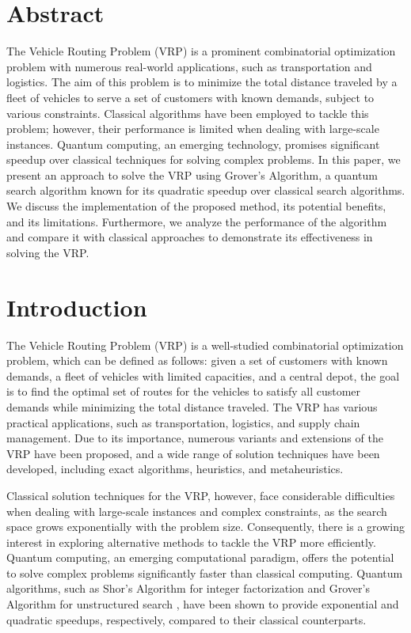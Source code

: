 \section{Abstract}

The Vehicle Routing Problem (VRP) is a prominent combinatorial optimization problem with numerous real-world applications, such as transportation and logistics. The aim of this problem is to minimize the total distance traveled by a fleet of vehicles to serve a set of customers with known demands, subject to various constraints. Classical algorithms have been employed to tackle this problem; however, their performance is limited when dealing with large-scale instances. Quantum computing, an emerging technology, promises significant speedup over classical techniques for solving complex problems. In this paper, we present an approach to solve the VRP using Grover's Algorithm, a quantum search algorithm known for its quadratic speedup over classical search algorithms. We discuss the implementation of the proposed method, its potential benefits, and its limitations. Furthermore, we analyze the performance of the algorithm and compare it with classical approaches to demonstrate its effectiveness in solving the VRP.

\section{Introduction}

The Vehicle Routing Problem (VRP) is a well-studied combinatorial optimization problem, which can be defined as follows: given a set of customers with known demands, a fleet of vehicles with limited capacities, and a central depot, the goal is to find the optimal set of routes for the vehicles to satisfy all customer demands while minimizing the total distance traveled. The VRP has various practical applications, such as transportation, logistics, and supply chain management. Due to its importance, numerous variants and extensions of the VRP have been proposed, and a wide range of solution techniques have been developed, including exact algorithms, heuristics, and metaheuristics.

Classical solution techniques for the VRP, however, face considerable difficulties when dealing with large-scale instances and complex constraints, as the search space grows exponentially with the problem size. Consequently, there is a growing interest in exploring alternative methods to tackle the VRP more efficiently. Quantum computing, an emerging computational paradigm, offers the potential to solve complex problems significantly faster than classical computing. Quantum algorithms, such as Shor's Algorithm for integer factorization \cite{shor1994} and Grover's Algorithm for unstructured search \cite{grover1996}, have been shown to provide exponential and quadratic speedups, respectively, compared to their classical counterparts.


